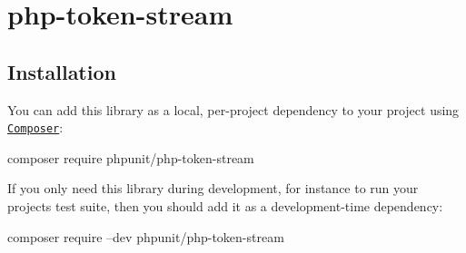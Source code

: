 \href{https://travis-ci.org/sebastianbergmann/php-token-stream}{\tt }

\section*{php-\/token-\/stream}

\subsection*{Installation}

You can add this library as a local, per-\/project dependency to your project using \href{https://getcomposer.org/}{\tt Composer}\+: \begin{DoxyVerb}composer require phpunit/php-token-stream
\end{DoxyVerb}


If you only need this library during development, for instance to run your project\textquotesingle{}s test suite, then you should add it as a development-\/time dependency\+: \begin{DoxyVerb}composer require --dev phpunit/php-token-stream\end{DoxyVerb}
 